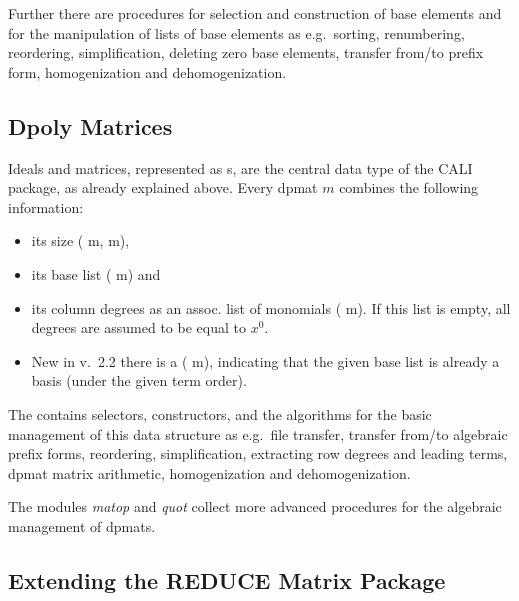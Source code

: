 Further there are procedures for selection and construction of base
elements and for the manipulation of lists of base elements as e.g.\
sorting, renumbering, reordering, simplification, deleting zero base
elements, transfer from/to prefix form, homogenization and dehomogenization.

\subsection{Dpoly Matrices}

Ideals and matrices, represented as s, are the central
data type of the CALI package, as already explained above. Every
dpmat $m$ combines the following information:
\begin{itemize}
\item its size ( m, m),

\item its base list ( m) and

\item its column degrees as an assoc. list of monomials
( m). If this list is empty, all degrees are
assumed to be equal to $x^0$.

\item New in v.\ 2.2 there is a  ( m),
indicating that the given base list is already a \gr basis (under the
given term order).
\end{itemize}

The  contains selectors, constructors, and the
algorithms for the basic management of this data structure as e.g.\
file transfer, transfer from/to algebraic prefix forms, reordering,
simplification, extracting row degrees and leading terms, dpmat matrix
arithmetic, homogenization and dehomogenization.

The modules {\em matop} and {\em quot} collect more advanced procedures
for the algebraic management of dpmats.

\subsection{Extending the REDUCE Matrix Package}

